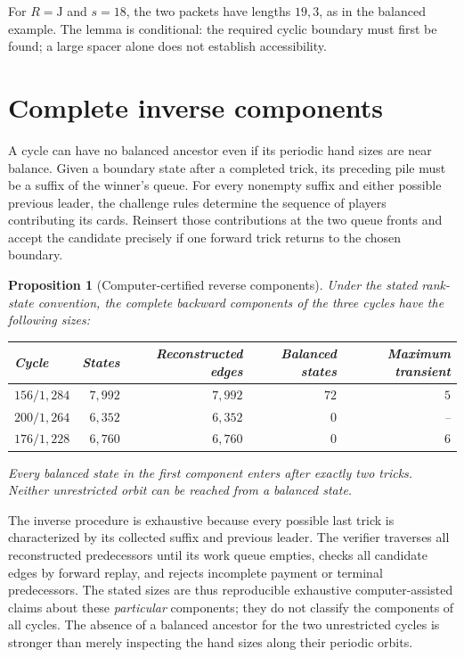 \documentclass[11pt]{article}
\newtheorem{proposition}{Proposition}
\newcommand{\J}{\mathrm J}
\begin{document}
For $R=\J$ and $s=18$, the two packets have lengths $19,3$, as in the
balanced example. The lemma is conditional: the required cyclic boundary
must first be found; a large spacer alone does not establish accessibility.

\section{Complete inverse components}
A cycle can have no balanced ancestor even if its periodic hand sizes are
near balance. Given a boundary state after a completed trick, its preceding
pile must be a suffix of the winner's queue. For every nonempty suffix
and either possible previous leader, the challenge rules determine the
sequence of players contributing its cards. Reinsert those contributions
at the two queue fronts and accept the candidate precisely if one forward
trick returns to the chosen boundary.

\begin{proposition}[Computer-certified reverse components]
Under the stated rank-state convention, the complete backward components
of the three cycles have the following sizes:
\begin{center}
\begin{tabular}{@{}lrrrr@{}}
\toprule
Cycle & States & Reconstructed edges & Balanced states & Maximum transient\\
\midrule
$156/1{,}284$ & $7{,}992$ & $7{,}992$ & $72$ & $5$\\
$200/1{,}264$ & $6{,}352$ & $6{,}352$ & $0$ & --\\
$176/1{,}228$ & $6{,}760$ & $6{,}760$ & $0$ & $6$\\
\bottomrule
\end{tabular}
\end{center}
Every balanced state in the first component enters after exactly two
tricks. Neither unrestricted orbit can be reached from a balanced state.
\end{proposition}

The inverse procedure is exhaustive because every possible last trick is
characterized by its collected suffix and previous leader. The verifier
traverses all reconstructed predecessors until its work queue empties,
checks all candidate edges by forward replay, and rejects incomplete
payment or terminal predecessors. The stated sizes are thus reproducible
exhaustive computer-assisted claims about these \emph{particular} components;
they do not classify the components of all cycles. The absence of a balanced
ancestor for the two unrestricted cycles is stronger than merely inspecting
the hand sizes along their periodic orbits.
\end{document}
